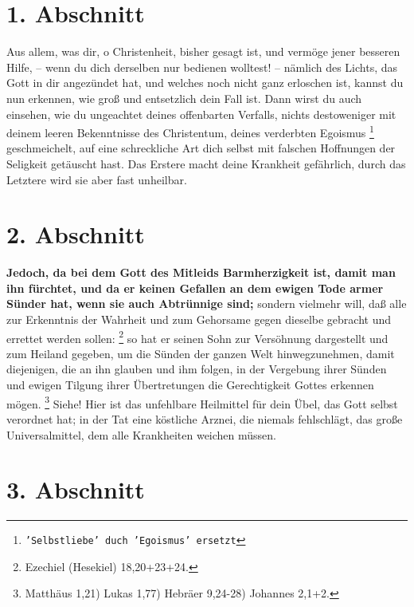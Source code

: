 \section{1. Abschnitt}  \label{kap2_ab1}

Aus allem, was dir, o Christenheit, bisher gesagt ist, und vermöge jener besseren
Hilfe, -- wenn du dich derselben nur bedienen wolltest! -- nämlich des Lichts,
das Gott in dir angezündet hat, und welches noch nicht ganz erloschen ist,
kannst du nun erkennen, wie groß und entsetzlich dein Fall ist. Dann wirst du
auch einsehen, wie du ungeachtet deines offenbarten Verfalls, nichts
destoweniger mit deinem leeren Bekenntnisse des Christentum, deines verderbten
Egoismus
\footnote{\texttt{'Selbstliebe' duch 'Egoismus' ersetzt}} geschmeichelt,
auf eine schreckliche Art dich selbst mit
falschen Hoffnungen der Seligkeit getäuscht hast. Das Erstere macht deine
Krankheit gefährlich, durch das Letztere wird sie aber fast unheilbar.

\section{2. Abschnitt}  \label{kap2_ab2}

\textbf{Jedoch, da bei dem Gott des Mitleids Barmherzigkeit ist, damit man ihn
fürchtet, und da er keinen Gefallen an dem ewigen Tode  armer
Sünder hat, wenn
sie auch Abtrünnige sind;} sondern vielmehr will, daß alle zur Erkenntnis der
Wahrheit und zum Gehorsame gegen dieselbe gebracht und errettet werden
sollen:
\footnote{Ezechiel (Hesekiel) 18,20+23+24.}
 so hat er seinen Sohn zur
Versöhnung
dargestellt und zum Heiland gegeben, um die Sünden der ganzen Welt
hinwegzunehmen, damit diejenigen, die an ihn glauben und ihm folgen, in der
Vergebung ihrer Sünden und ewigen Tilgung ihrer Übertretungen die
Gerechtigkeit Gottes erkennen mögen.
\footnote{Matthäus 1,21) Lukas 1,77) Hebräer 9,24-28) Johannes 2,1+2.}
Siehe! Hier ist das unfehlbare Heilmittel für dein
Übel, das Gott selbst verordnet hat; in der Tat eine köstliche Arznei, die
niemals fehlschlägt, das große Universalmittel, dem alle Krankheiten weichen
müssen.

\section{3. Abschnitt}  \label{kap2_ab3}


